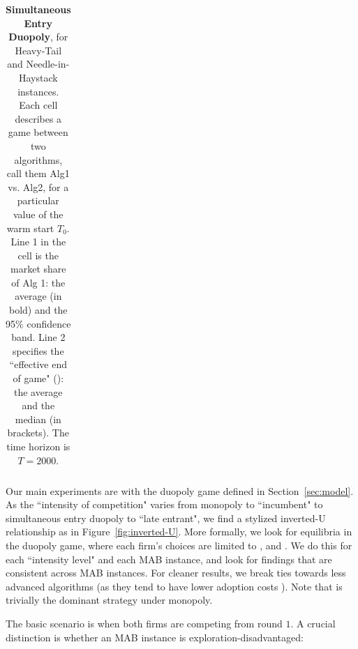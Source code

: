 \documentclass[../competing_bandits_with_appendix.tex]{subfiles}
\begin{document}
\begin{table}[t]
\begin{tabular}{|c|c|c|c||c|c|c|}
  \\
   \hline
\end{tabular}
\normalsize
\caption{{\bf Simultaneous Entry Duopoly}, for Heavy-Tail and Needle-in-Haystack instances. Each cell describes a game between two algorithms, call them Alg1 vs. Alg2, for a particular value of the warm start $T_0$. Line 1 in the cell is the market share of Alg 1: the average (in bold) and the 95\% confidence band.
Line 2 specifies the ``effective end of game" (\Eeog): the average and the median (in brackets). The time horizon is $T=2000$.}
\label{sim_table}
\end{table}

\normalsize
Our main experiments are with the duopoly game defined in Section~\ref{sec:model}. As the ``intensity of competition" varies from  monopoly to ``incumbent" to simultaneous entry duopoly to ``late entrant", we find a stylized inverted-U relationship as in Figure~\ref{fig:inverted-U}. More formally, we look for equilibria in the duopoly game, where each firm's choices are limited to \DG, \DEG and \TS. We do this for each ``intensity level" and each MAB instance, and look for findings that are consistent across MAB instances. For cleaner results, we break ties towards less advanced algorithms (as they tend to have lower adoption costs \cite{MWT-WhitePaper-2016,DS-arxiv}). Note that \DG is trivially the dominant strategy under monopoly.



The basic scenario is when both firms are competing from round $1$. A crucial distinction is whether an MAB instance is exploration-disadvantaged:

\end{document}
